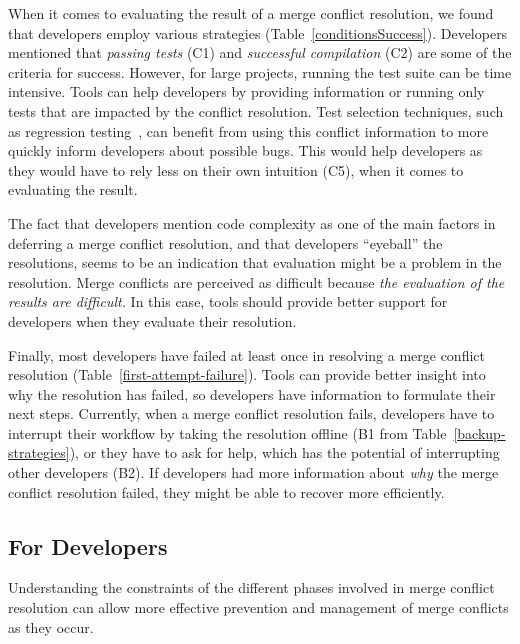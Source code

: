When it comes to evaluating the result of a merge conflict resolution, we found that developers employ various strategies (Table~\ref{conditionsSuccess}).
Developers mentioned that \textit{passing tests} (C1) and \textit{successful compilation} (C2) are some of the criteria for success.
However, for large projects, running the test suite can be time intensive.
Tools can help developers by providing information or running only tests that are impacted by the conflict resolution.
Test selection techniques, such as regression testing~\cite{gligoric2015practical}, can benefit from using this conflict information to more quickly inform developers about possible bugs.
This would help developers as they would have to rely less on their own intuition (C5), when it comes to evaluating the result.

The fact that developers mention code complexity as one of the main factors in deferring a merge conflict resolution, and that developers ``eyeball'' the resolutions, seems to be an indication that evaluation might be a problem in the resolution.
Merge conflicts are perceived as difficult because \emph{the evaluation of the results are difficult.}
In this case, tools should provide better support for developers when they evaluate their resolution.

Finally, most developers have failed at least once in resolving a merge conflict resolution (Table~\ref{first-attempt-failure}).
Tools can provide better insight into why the resolution has failed, so developers have information to formulate their next steps.
Currently, when a merge conflict resolution fails, developers have to interrupt their workflow by taking the resolution offline (B1 from Table~\ref{backup-strategies}), or they have to ask for help, which has the potential of interrupting other developers (B2).
If developers had more information about \emph{why} the merge conflict resolution failed, they might be able to recover more efficiently.

\subsection{For Developers}
Understanding the constraints of the different phases involved in merge conflict resolution can allow more effective prevention and management of merge conflicts as they occur.

